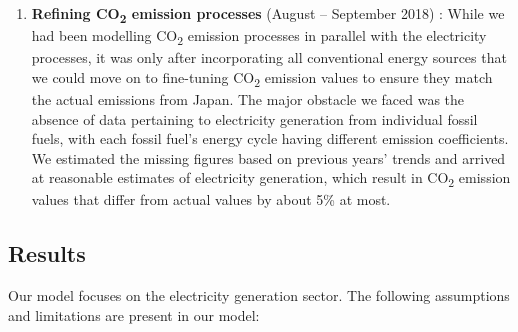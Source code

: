\documentclass[14pt,a4paper]{article} %
\begin{document}
\begin{enumerate}
\item \textbf{Refining CO\textsubscript{2} emission processes} (August – September 2018) : While we had been modelling CO\textsubscript{2} emission processes in parallel with the electricity processes, it was only after incorporating all conventional energy sources that we could move on to fine-tuning CO\textsubscript{2} emission values to ensure they match the actual emissions from Japan. The major obstacle we faced was the absence of data pertaining to electricity generation from individual fossil fuels, with each fossil fuel's energy cycle having different emission coefficients. We estimated the missing figures based on previous years' trends \cite{noauthor_energy_2018} \cite{noauthor_national_2018} and arrived at reasonable estimates of electricity generation, which result in CO\textsubscript{2} emission values that differ from actual values by about 5\% at most.

\end{enumerate}

\subsection{Results}

	Our model focuses on the electricity generation sector. The following assumptions and limitations are present in our model:
	
\end{document}
